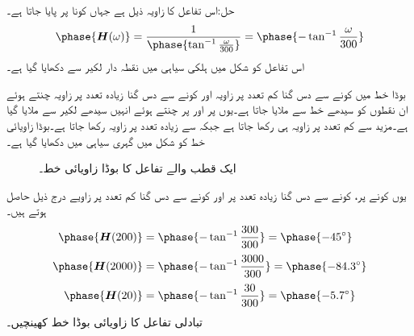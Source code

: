 حل:اس تفاعل کا زاویہ ذیل ہے جہاں کونا  پر پایا جاتا ہے۔
\begin{align}
\phase{\bH(\omega)}=\frac{1}{\phase{\tan^{-1} \frac{\omega}{300}}}=\phase{-\tan^{-1}\frac{\omega}{300}}
\end{align}
اس تفاعل کو شکل  میں ہلکی سیاہی میں نقطہ دار لکیر سے دکھایا گیا ہے۔

بوڈا خط میں کونے سے دس گنا کم تعدد پر زاویہ  اور کونے سے دس گنا زیادہ تعدد پر زاویہ  چنتے ہوئے ان نقطوں کو سیدھے خط سے ملایا جاتا ہے۔یوں  پر  اور   پر  چنتے ہوئے انہیں سیدھے لکیر سے ملایا گیا ہے۔مزید   سے کم تعدد پر زاویہ  ہی رکھا جاتا ہے جبکہ  سے زیادہ تعدد پر زاویہ  رکھا جاتا ہے۔بوڈا زاویائی خط کو شکل   میں گہری سیاہی میں دکھایا گیا ہے۔
\begin{figure}
\centering
{}
\caption{ایک قطب والے تفاعل کا بوڈا زاویائی خط۔}
\label{شکل_تعددی_زاویائی_بوڈا_ایک_قطب_الف}
\end{figure}

یوں کونے  پر، کونے سے دس گنا زیادہ تعدد  پر اور کونے سے دس گنا کم تعدد  پر زاویے درج ذیل حاصل ہوتے ہیں۔
\begin{align*}
\phase{\bH(200)}&=\phase{-\tan^{-1} \frac{300}{300}}=\phase{-45^{\circ}}\\[0.5ex]
\phase{\bH(2000)}&=\phase{-\tan^{-1} \frac{3000}{300}}=\phase{-84.3^{\circ}}\\[0.5ex]
\phase{\bH(20)}&=\phase{-\tan^{-1} \frac{30}{300}}=\phase{-5.7^{\circ}}
\end{align*}
تبادلی تفاعل  کا زاویائی بوڈا خط کھینچیں۔

